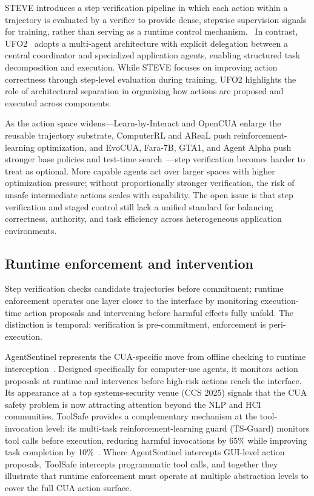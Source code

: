 STEVE introduces a step verification pipeline in which each action within a trajectory is evaluated by a verifier to provide dense, stepwise supervision signals for training, rather than serving as a runtime control mechanism.~\cite{steve2025} In contrast, UFO2~\cite{ufo2025} adopts a multi-agent architecture with explicit delegation between a central coordinator and specialized application agents, enabling structured task decomposition and execution. While STEVE focuses on improving action correctness through step-level evaluation during training, UFO2 highlights the role of architectural separation in organizing how actions are proposed and executed across components.

As the action space widens---Learn-by-Interact and OpenCUA enlarge the reusable trajectory substrate, ComputerRL and AReaL push reinforcement-learning optimization, and EvoCUA, Fara-7B, GTA1, and Agent Alpha push stronger base policies and test-time search~\cite{learnbyinteract2025,opencua2025,computerrl2025,areal2025,evocua2026,fara2025,gta12025,agentalpha2026}---step verification becomes harder to treat as optional. More capable agents act over larger spaces with higher optimization pressure; without proportionally stronger verification, the risk of unsafe intermediate actions scales with capability. The open issue is that step verification and staged control still lack a unified standard for balancing correctness, authority, and task efficiency across heterogeneous application environments.

\subsection{Runtime enforcement and intervention}

Step verification checks candidate trajectories before commitment; runtime enforcement operates one layer closer to the interface by monitoring execution-time action proposals and intervening before harmful effects fully unfold. The distinction is temporal: verification is pre-commitment, enforcement is peri-execution.

AgentSentinel represents the CUA-specific move from offline checking to runtime interception~\cite{agentsentinel2025}. Designed specifically for computer-use agents, it monitors action proposals at runtime and intervenes before high-risk actions reach the interface. Its appearance at a top systems-security venue (CCS 2025) signals that the CUA safety problem is now attracting attention beyond the NLP and HCI communities. ToolSafe provides a complementary mechanism at the tool-invocation level: its multi-task reinforcement-learning guard (TS-Guard) monitors tool calls before execution, reducing harmful invocations by 65\% while improving task completion by 10\%~\cite{toolsafe2026}. Where AgentSentinel intercepts GUI-level action proposals, ToolSafe intercepts programmatic tool calls, and together they illustrate that runtime enforcement must operate at multiple abstraction levels to cover the full CUA action surface.

